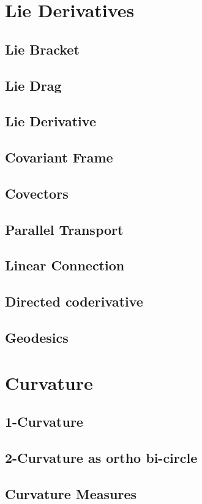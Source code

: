 \documentclass[a4paper]{book}
\numberwithin{equation}{chapter}
\begin{document}
\section{Lie Derivatives}
\subsection{Lie Bracket}
\subsection{Lie Drag}
\subsection{Lie Derivative}
\subsection{Covariant Frame}
\subsection{Covectors}
\subsection{Parallel Transport}
\subsection{Linear Connection}
\subsection{Directed coderivative}
\subsection{Geodesics}

\section{Curvature}
\subsection{1-Curvature}
\subsection{2-Curvature as ortho bi-circle}
\subsection{Curvature Measures}
\end{document}
